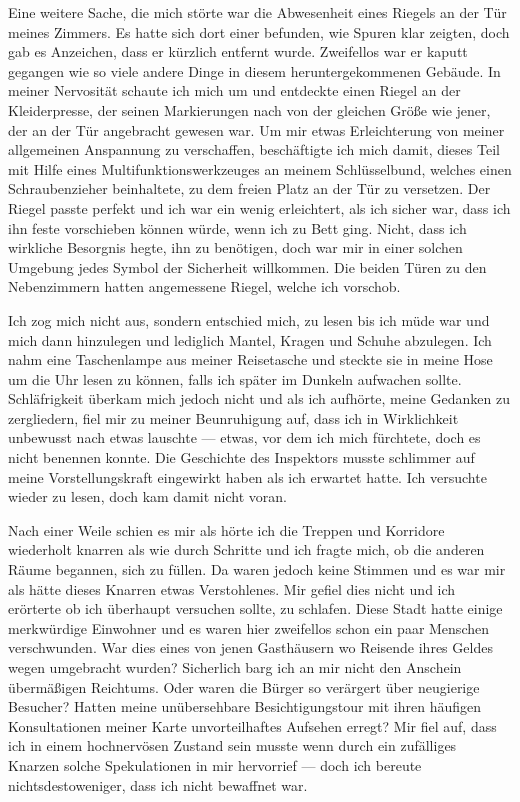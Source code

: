 Eine weitere Sache, die mich störte war die Abwesenheit eines Riegels an der Tür meines Zimmers. Es hatte sich dort einer befunden, wie Spuren klar zeigten, doch gab es Anzeichen, dass er kürzlich entfernt wurde. Zweifellos war er kaputt gegangen wie so viele andere Dinge in diesem heruntergekommenen Gebäude. In meiner Nervosität schaute ich mich um und entdeckte einen Riegel an der Kleiderpresse, der seinen Markierungen nach von der gleichen Größe wie jener, der an der Tür angebracht gewesen war. Um mir etwas Erleichterung von meiner allgemeinen Anspannung zu verschaffen, beschäftigte ich mich damit, dieses Teil mit Hilfe eines Multifunktionswerkzeuges an meinem Schlüsselbund, welches einen Schraubenzieher beinhaltete, zu dem freien Platz an der Tür zu versetzen. Der Riegel passte perfekt und ich war ein wenig erleichtert, als ich sicher war, dass ich ihn feste vorschieben können würde, wenn ich zu Bett ging. Nicht, dass ich wirkliche Besorgnis hegte, ihn zu benötigen, doch war mir in einer solchen Umgebung jedes Symbol der Sicherheit willkommen. Die beiden Türen zu den Nebenzimmern hatten angemessene Riegel, welche ich vorschob.

Ich zog mich nicht aus, sondern entschied mich, zu lesen bis ich müde war und mich dann hinzulegen und lediglich Mantel, Kragen und Schuhe abzulegen. Ich nahm eine Taschenlampe aus meiner Reisetasche und steckte sie in meine Hose um die Uhr lesen zu können, falls ich später im Dunkeln aufwachen sollte. Schläfrigkeit überkam mich jedoch nicht und als ich aufhörte, meine Gedanken zu zergliedern, fiel mir zu meiner Beunruhigung auf, dass ich in Wirklichkeit unbewusst nach etwas lauschte --- etwas, vor dem ich mich fürchtete, doch es nicht benennen konnte. Die Geschichte des Inspektors musste schlimmer auf meine Vorstellungskraft eingewirkt haben als ich erwartet hatte. Ich versuchte wieder zu lesen, doch kam damit nicht voran.

Nach einer Weile schien es mir als hörte ich die Treppen und Korridore wiederholt knarren als wie durch Schritte und ich fragte mich, ob die anderen Räume begannen, sich zu füllen. Da waren jedoch keine Stimmen und es war mir als hätte dieses Knarren etwas Verstohlenes. Mir gefiel dies nicht und ich erörterte ob ich überhaupt versuchen sollte, zu schlafen. Diese Stadt hatte einige merkwürdige Einwohner und es waren hier zweifellos schon ein paar Menschen verschwunden. War dies eines von jenen Gasthäusern wo Reisende ihres Geldes wegen umgebracht wurden? Sicherlich barg ich an mir nicht den Anschein übermäßigen Reichtums. Oder waren die Bürger so verärgert über neugierige Besucher? Hatten meine unübersehbare Besichtigungstour mit ihren häufigen Konsultationen meiner Karte unvorteilhaftes Aufsehen erregt? Mir fiel auf, dass ich in einem hochnervösen Zustand sein musste wenn durch ein zufälliges Knarzen solche Spekulationen in mir hervorrief --- doch ich bereute nichtsdestoweniger, dass ich nicht bewaffnet war.

